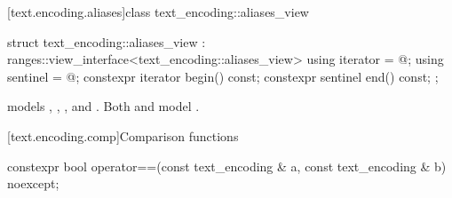 \documentclass{wg21}
\begin{document}
\begin{addedblock}
\begin{itemdescr}
\returns {}
\end{itemdescr}

%


[text.encoding.aliases]{class text_encoding::aliases_view}

\begin{codeblock}
struct text_encoding::aliases_view : ranges::view_interface<text_encoding::aliases_view> {
    using iterator = @\impdef@;
    using sentinel = @\impdef@;
    constexpr iterator begin() const;
    constexpr sentinel end() const;
};
\end{codeblock}

 models , , , and .
Both  and  model .


%
%


[text.encoding.comp]{Comparison functions}

\begin{itemdecl}
    constexpr bool operator==(const text_encoding & a, const text_encoding & b) noexcept;
\end{itemdecl}


\end{addedblock}
\end{document}
